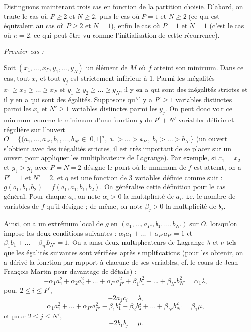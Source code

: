 \begin{sol}
Distinguons maintenant trois cas en fonction de la partition choisie. D'abord, on traite le cas où $P \ge 2$ et $N \ge 2$, puis le cas où $P=1$ et $N \ge 2$ (ce qui est équivalent au cas où $P \ge 2$ et $N=1$), enfin le cas où $P=1$ et $N=1$ (c'est le cas où $n=2$, ce qui peut être vu comme l'initialisation de cette récurrence).

\textit{Premier cas :}

Soit $(x_1,\dots,x_P,y_1,\dots,y_N)$ un élément de $M$ où $f$ atteint son minimum. Dans ce cas, tout $x_i$ et tout $y_j$ est strictement inférieur à $1$. Parmi les inégalités $x_1 \ge x_2 \ge \dots \ge x_P$ et $y_1 \ge y_2 \ge \dots \ge y_N$, il y en a qui sont des inégalités strictes et il y en a qui sont des égalités. Supposons qu'il y a $P' \ge 1$ variables distinctes parmi les $x_i$ et $N' \ge 1$ variables distinctes parmi les $y_j$. On peut donc voir ce minimum comme le minimum d'une fonction $g$ de $P'+N'$ variables définie et régulière sur l'ouvert $O=\{(a_1,\dots,a_{P'},b_1,\dots,b_{N'} \in ]0,1[^n,\ a_1>\dots>a_{P'},\ b_1>\dots>b_{N'}\}$ (un ouvert s'obtient avec des inégalités strictes, il est très important de se placer sur un ouvert pour appliquer les multiplicateurs de Lagrange). Par exemple, si $x_1=x_2$ et $y_1>y_2$ avec $P=N=2$ désigne le point où le minimum de $f$ est atteint, on a $P'=1$ et $N'=2$, et $g$ est une fonction de $3$ variables définie comme suit : $g(a_1,b_1,b_2)=f(a_1,a_1,b_1,b_2)$. On généralise cette définition pour le cas général. Pour chaque $a_i$, on note $\alpha_i>0$ la multiplicité de $a_i$, i.e. le nombre de variables de $f$ qu'il désigne ; de même, on note $\beta_j>0$ la multiplicité de $b_j$.

Ainsi, on a un extrémum local de $g$ en $(a_1,\dots,a_{P'},b_1,\dots,b_{N'})$ sur $O$, lorsqu'on impose les deux conditions suivantes : $\alpha_1 a_1 +\dots+ \alpha_{P'} a_{P'} =1$ et $\beta_1 b_1 +\dots+ \beta_{n'} b_{N'} =1$. On a ainsi deux multiplicateurs de Lagrange $\lambda$ et $\nu$ tels que les égalités suivantes sont vérifiées après simplifications (pour les obtenir, on a dérivé la fonction par rapport à chacune de ses variables, cf. le cours de Jean-François Martin pour davantage de détails) :
$$
-\alpha_1 a_1^2 + \alpha_2 a_2^2 +\dots+ \alpha_{P'} a_{P'}^2 + \beta_1 b_1^2 +\dots+\beta_{N'} b_{N'}^2 = \alpha_1 \lambda,
$$
pour $2 \le i \le P'$,
$$
-2 a_1 a_i = \lambda,
$$
$$
\alpha_1 a_1^2 +\dots+ \alpha_{P'} a_{P'}^2 -\beta_1 b_1^2 +\beta_2 b_2^2 +\dots+\beta_{N'} b_{N'}^2 = \beta_1 \mu,
$$
et pour $2 \le j \le N'$,
$$
-2 b_1 b_j =\mu.
$$


\end{sol}
